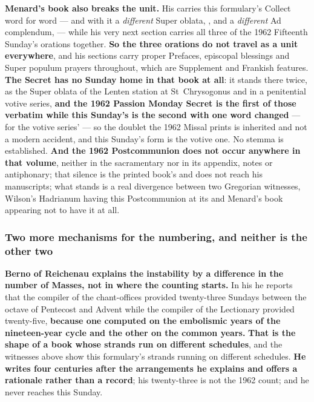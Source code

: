 \textbf{Menard's book also breaks the unit.} His  carries this formulary's Collect word for word --- and with it a
\emph{different} Super oblata, , and a
\emph{different} Ad complendum,  --- while
his very next section carries all three of the 1962 Fifteenth Sunday's orations
together. \textbf{So the three orations do not travel as a unit everywhere},
and his sections carry proper Prefaces, episcopal blessings and Super populum
prayers throughout, which are Supplement and Frankish features. \textbf{The
Secret has no Sunday home in that book at all}: it stands there twice, as the
Super oblata of the Lenten station at St~Chrysogonus and in a penitential votive
series, \textbf{and the 1962 Passion Monday Secret is the first of those
verbatim while this Sunday's is the second with one word changed} ---
 for the votive series'  --- so the
doublet the 1962 Missal prints is inherited and not a modern accident, and this
Sunday's form is the votive one. No stemma is established.
\textbf{And the 1962 Postcommunion does not occur anywhere in that
volume}, neither in the sacramentary nor in its appendix, notes or antiphonary;
that silence is the printed book's and does not reach
his manuscripts; what stands is a real divergence between two
Gregorian witnesses, Wilson's Hadrianum having this Postcommunion at its
 and Menard's book appearing not to have it at all.

\subsubsection*{Two more mechanisms for the numbering, and neither is the other two}

\textbf{Berno of Reichenau explains the instability by a difference in the
number of Masses, not in where the counting starts.} In his  he
reports that the compiler of the chant-offices provided twenty-three Sundays
between the octave of Pentecost and Advent while the compiler of the Lectionary
provided twenty-five, \textbf{because one computed on the embolismic years of
the nineteen-year cycle and the other on the common years.} \textbf{That is the
shape of a book whose strands run on different schedules}, and the witnesses
above show this formulary's strands running on different schedules. \textbf{He writes four centuries after the
arrangements he explains and offers a rationale rather than a record}; his
twenty-three is not the 1962 count; and he never reaches this Sunday.

